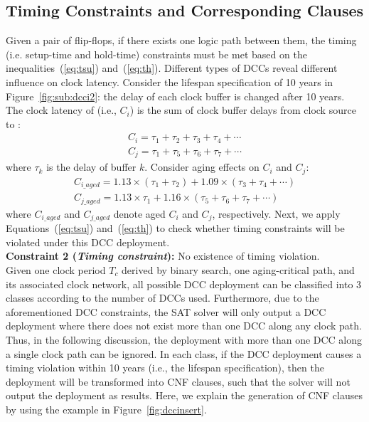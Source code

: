 \subsection{Timing Constraints and Corresponding Clauses}
\label{subsec:tccc}
Given a pair of flip-flops, if there exists one logic path between them, the timing (i.e. setup-time and hold-time) constraints must be met based on the inequalities~(\ref{eq:tsu}) and~(\ref{eq:th}). Different types of DCCs reveal different influence on clock latency. Consider the lifespan specification of 10 years in Figure~\ref{fig:sub:dcci2}: the delay of each clock buffer is changed after 10 years. The clock latency of  (i.e., $C_i$) is the sum of clock buffer delays from clock source to : 
\begin{gather*}
C_i = \tau_1 + \tau_2 + \tau_3 + \tau_4 +\dotsb \\
C_j = \tau_1 + \tau_5 + \tau_6 + \tau_7 +\dotsb
\end{gather*}
where $\tau_k$ is the delay of buffer $k$. Consider aging effects on $C_i$ and $C_j$: 
\begin{gather*}
C_{i\_aged} = 1.13 \times \left(\tau_1 + \tau_2\right) + 1.09 \times \left(\tau_3 + \tau_4 + \dotsb\right)\\
C_{j\_aged} = 1.13 \times \tau_1+ 1.16 \times \left( \tau_5 + \tau_6 + \tau_7 + \dotsb \right)
\end{gather*}
where $C_{i\_aged}$ and $C_{j\_aged}$ denote aged $C_i$ and $C_j$, respectively. Next, we apply Equations~(\ref{eq:tsu}) and~(\ref{eq:th}) to check whether timing constraints will be violated under this DCC deployment.\\

\noindent \textbf{Constraint 2 (\textit{Timing constraint}):} No existence of timing violation.\\

Given one clock period $T_c$ derived by binary search, one aging-critical path, and its associated clock network, all possible DCC deployment can be classified into 3 classes according to the number of DCCs used. Furthermore, due to the aforementioned DCC constraints, the SAT solver will only output a DCC deployment where there does not exist more than one DCC along any clock path. Thus, in the following discussion, the deployment with more than one DCC along a single clock path can be ignored. In each class, if the DCC deployment causes a timing violation within 10 years (i.e., the lifespan specification), then the deployment will be transformed into CNF clauses, such that the solver will not output the deployment as results. Here, we explain the generation of CNF clauses by using the example in Figure~\ref{fig:dccinsert}.\\

